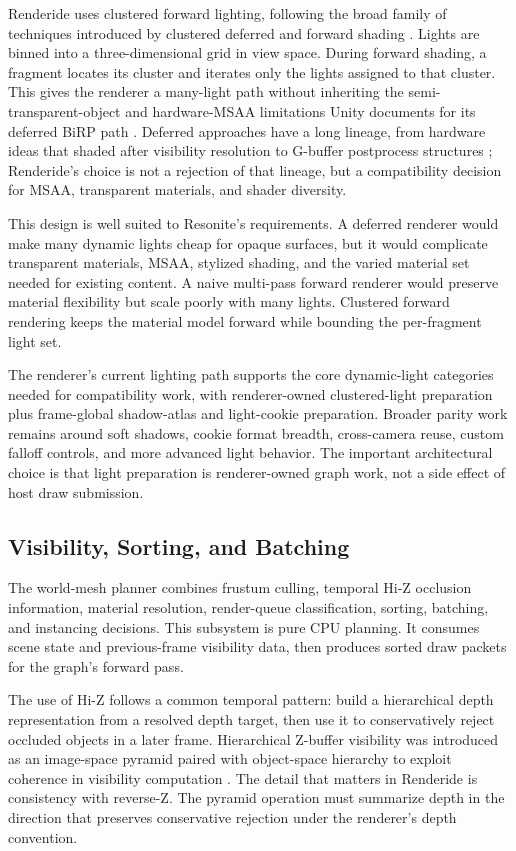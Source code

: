 \documentclass[acmtog,screen,nonacm]{acmart}
\begin{document}
Renderide uses clustered forward lighting, following the broad family of techniques introduced by clustered deferred and forward shading \citep{olsson2012clustered}. Lights are binned into a three-dimensional grid in view space. During forward shading, a fragment locates its cluster and iterates only the lights assigned to that cluster. This gives the renderer a many-light path without inheriting the semi-transparent-object and hardware-MSAA limitations Unity documents for its deferred BiRP path \citep{unityRenderingPaths}. Deferred approaches have a long lineage, from hardware ideas that shaded after visibility resolution to G-buffer postprocess structures \citep{deering1988deferred,saito1990gbuffer}; Renderide's choice is not a rejection of that lineage, but a compatibility decision for MSAA, transparent materials, and shader diversity.

This design is well suited to Resonite's requirements. A deferred renderer would make many dynamic lights cheap for opaque surfaces, but it would complicate transparent materials, MSAA, stylized shading, and the varied material set needed for existing content. A naive multi-pass forward renderer would preserve material flexibility but scale poorly with many lights. Clustered forward rendering keeps the material model forward while bounding the per-fragment light set.

The renderer's current lighting path supports the core dynamic-light categories needed for compatibility work, with renderer-owned clustered-light preparation plus frame-global shadow-atlas and light-cookie preparation. Broader parity work remains around soft shadows, cookie format breadth, cross-camera reuse, custom falloff controls, and more advanced light behavior. The important architectural choice is that light preparation is renderer-owned graph work, not a side effect of host draw submission.

\subsection{Visibility, Sorting, and Batching}

The world-mesh planner combines frustum culling, temporal Hi-Z occlusion information, material resolution, render-queue classification, sorting, batching, and instancing decisions. This subsystem is pure CPU planning. It consumes scene state and previous-frame visibility data, then produces sorted draw packets for the graph's forward pass.

The use of Hi-Z follows a common temporal pattern: build a hierarchical depth representation from a resolved depth target, then use it to conservatively reject occluded objects in a later frame. Hierarchical Z-buffer visibility was introduced as an image-space pyramid paired with object-space hierarchy to exploit coherence in visibility computation \citep{greene1993hiz}. The detail that matters in Renderide is consistency with reverse-Z. The pyramid operation must summarize depth in the direction that preserves conservative rejection under the renderer's depth convention.
\end{document}
